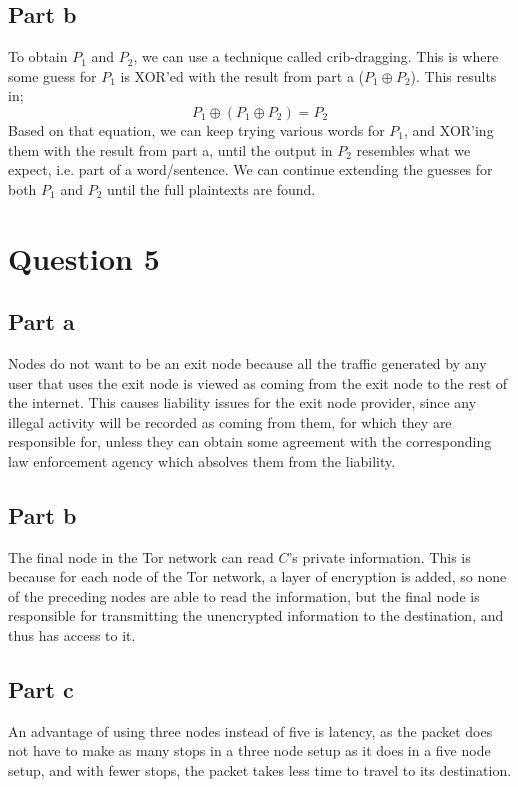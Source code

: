 \documentclass[12pt,a4paper]{article}
\begin{document}
\subsection{Part b}
To obtain \(P_1\) and \(P_2\), we can use a technique called crib-dragging. This is where some guess for \(P_1\) is XOR'ed with the result from part a (\(P_1 \oplus P_2\)). This results in;
\[ P_1 \oplus (P_1 \oplus P_2) = P_2 \]
Based on that equation, we can keep trying various words for \(P_1\), and XOR'ing them with the result from part a, until the output in \(P_2\) resembles what we expect, i.e. part of a word/sentence. We can continue extending the guesses for both \(P_1\) and \(P_2\) until the full plaintexts are found.

\section{Question 5}
\subsection{Part a}
Nodes do not want to be an exit node because all the traffic generated by any user that uses the exit node is viewed as coming from the exit node to the rest of the internet. This causes liability issues for the exit node provider, since any illegal activity will be recorded as coming from them, for which they are responsible for, unless they can obtain some agreement with the corresponding law enforcement agency which absolves them from the liability.

\subsection{Part b}
The final node in the Tor network can read $C$'s private information. This is because for each node of the Tor network, a layer of encryption is added, so none of the preceding nodes are able to read the information, but the final node is responsible for transmitting the unencrypted information to the destination, and thus has access to it.

\subsection{Part c}
An advantage of using three nodes instead of five is latency, as the packet does not have to make as many stops in a three node setup as it does in a five node setup, and with fewer stops, the packet takes less time to travel to its destination.
\end{document}
